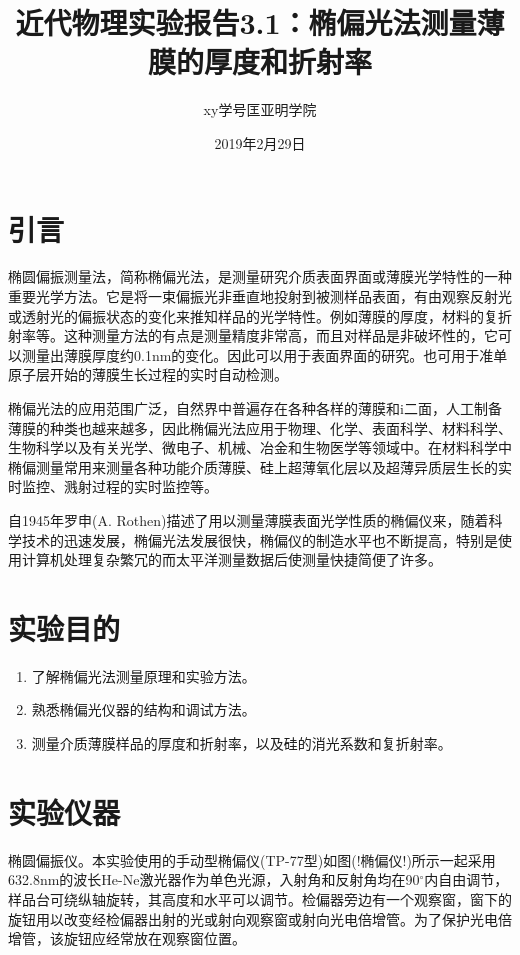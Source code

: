 \documentclass[a4paper]{article}
\title{近代物理实验报告3.1：椭偏光法测量薄膜的厚度和折射率}
\author{xy\quad 学号\quad 匡亚明学院}
\date{2019年2月29日}
\begin{document}
\maketitle


\section{引言}
椭圆偏振测量法，简称椭偏光法，是测量研究介质表面界面或薄膜光学特性的一种重要光学方法。它是将一束偏振光非垂直地投射到被测样品表面，有由观察反射光或透射光的偏振状态的变化来推知样品的光学特性。例如薄膜的厚度，材料的复折射率等。这种测量方法的有点是测量精度非常高，而且对样品是非破坏性的，它可以测量出薄膜厚度约0.1nm的变化。因此可以用于表面界面的研究。也可用于准单原子层开始的薄膜生长过程的实时自动检测。

椭偏光法的应用范围广泛，自然界中普遍存在各种各样的薄膜和i二面，人工制备薄膜的种类也越来越多，因此椭偏光法应用于物理、化学、表面科学、材料科学、生物科学以及有关光学、微电子、机械、冶金和生物医学等领域中。在材料科学中椭偏测量常用来测量各种功能介质薄膜、硅上超薄氧化层以及超薄异质层生长的实时监控、溅射过程的实时监控等。

自1945年罗申(A. Rothen)描述了用以测量薄膜表面光学性质的椭偏仪来，随着科学技术的迅速发展，椭偏光法发展很快，椭偏仪的制造水平也不断提高，特别是使用计算机处理复杂繁冗的而太平洋测量数据后使测量快捷简便了许多。

\section{实验目的}
\begin{enumerate}
\item 了解椭偏光法测量原理和实验方法。
\item 熟悉椭偏光仪器的结构和调试方法。
\item 测量介质薄膜样品的厚度和折射率，以及硅的消光系数和复折射率。
\end{enumerate}

\section{实验仪器}
椭圆偏振仪。本实验使用的手动型椭偏仪(TP-77型)如图(!椭偏仪!)所示一起采用632.8nm的波长He-Ne激光器作为单色光源，入射角和反射角均在90$^{\circ}$内自由调节，样品台可绕纵轴旋转，其高度和水平可以调节。检偏器旁边有一个观察窗，窗下的旋钮用以改变经检偏器出射的光或射向观察窗或射向光电倍增管。为了保护光电倍增管，该旋钮应经常放在观察窗位置。
\end{document}
